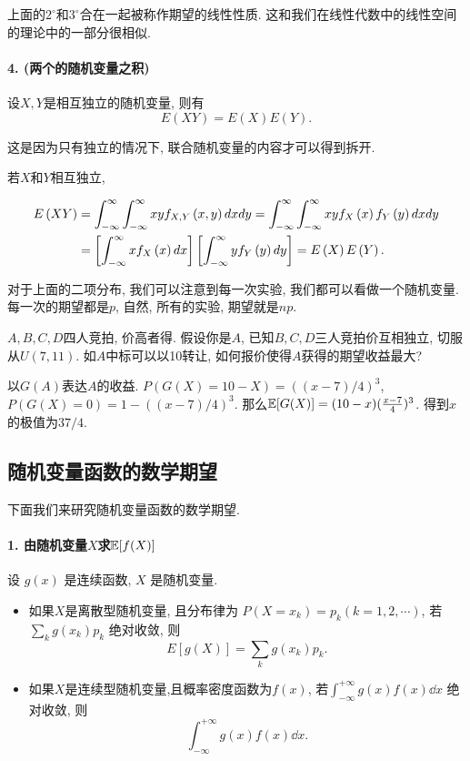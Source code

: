     上面的$2^\circ$和$3^\circ$合在一起被称作期望的线性性质. 这和我们在线性代数中的线性空间的理论中的一部分很相似. 

    \paragraph{4. (两个的随机变量之积)} 设$X,Y$是相互独立的随机变量, 则有\[
        E\left(XY\right) = E\left(X\right)E\left(Y\right).
    \]



    这是因为只有独立的情况下, 联合随机变量的内容才可以得到拆开. 

    若$X$和$Y$相互独立, 
        
        \begin{align}
            E\left(XY\right) &= \int_{-\infty}^{\infty}\int_{-\infty}^{\infty}xyf_{X,Y}\left(x,y\right){d}x{d}y = \int_{-\infty}^{\infty}\int_{-\infty}^{\infty}xyf_X\left(x\right)f_Y\left(y\right){d}x{d}y\notag\\
            & = \left[\int_{-\infty}^{\infty}xf_X\left(x\right){d}x\right]\left[\int_{-\infty}^{\infty}yf_Y\left(y\right){d}y\right] = E\left(X\right)E\left(Y\right).\notag
        \end{align}

    对于上面的二项分布, 我们可以注意到每一次实验, 我们都可以看做一个随机变量. 每一次的期望都是$p$, 自然, 所有的实验, 期望就是$np$. 

    \begin{exercise}
        $A, B, C, D$四人竞拍, 价高者得. 假设你是$A$, 已知$B, C, D$三人竞拍价互相独立, 切服从$U(7,11)$. 如$A$中标可以以10转让, 如何报价使得$A$获得的期望收益最大?
    \end{exercise}

    \begin{solution}
        以$G(A)$表达$A$的收益. $P(G(X)=10-X)=((x-7)/4)^3$, $P(G(X)=0)=1-((x-7)/4)^3$. 那么$\mathbb E[G(X)]=(10-x)(\frac{x-7} 4)^3$. 得到$x$的极值为$37/4$. 
    \end{solution}
    


    \subsection{随机变量函数的数学期望}
    下面我们来研究随机变量函数的数学期望. 

    \paragraph{1. 由随机变量$X$求$\mathbb E[f(X)]$} 设 $g(x)$ 是连续函数, $X$ 是随机变量.
    \begin{itemize}
        \item 如果$X$是离散型随机变量, 且分布律为 $P\left(X=x_k\right)=p_k(k=1,2, \cdots)$, 若 $\sum_k g\left(x_k\right) p_k$ 绝对收敛, 则
        $$
        E[g(X)]=\sum_k g\left(x_k\right) p_k .
        $$
        \item 如果$X$是连续型随机变量,且概率密度函数为$f(x)$, 若$\int_{-\infty}^{+\infty} g(x)f(x)\dd x$ 绝对收敛, 则
        $$\int_{-\infty}^{+\infty} g(x)f(x)\dd x.$$
    \end{itemize}
    
